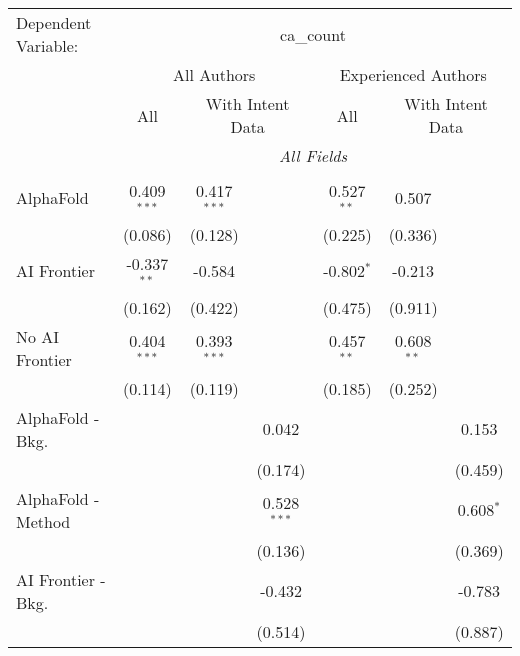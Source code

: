 \begingroup
\centering
\begin{tabular}{lcccccc}
   \tabularnewline \midrule \midrule
   Dependent Variable: & \multicolumn{6}{c}{ca\_count}\\
 & \multicolumn{3}{c}{All Authors} & \multicolumn{3}{c}{Experienced Authors} \\
\cmidrule(lr){2-4} \cmidrule(lr){5-7}
 & \multicolumn{1}{c}{All} & \multicolumn{2}{c}{With Intent Data} & \multicolumn{1}{c}{All} & \multicolumn{2}{c}{With Intent Data} \\
\cmidrule(lr){2-2} \cmidrule(lr){3-4} \cmidrule(lr){5-5} \cmidrule(lr){6-7}
 & \multicolumn{6}{c}{\textit{All Fields}} \\ \\
   AlphaFold               & 0.409$^{***}$ & 0.417$^{***}$ &               & 0.527$^{**}$ & 0.507        &   \\   
                           & (0.086)       & (0.128)       &               & (0.225)      & (0.336)      &   \\   
   AI Frontier             & -0.337$^{**}$ & -0.584        &               & -0.802$^{*}$ & -0.213       &   \\   
                           & (0.162)       & (0.422)       &               & (0.475)      & (0.911)      &   \\   
   No AI Frontier          & 0.404$^{***}$ & 0.393$^{***}$ &               & 0.457$^{**}$ & 0.608$^{**}$ &   \\   
                           & (0.114)       & (0.119)       &               & (0.185)      & (0.252)      &   \\   
   AlphaFold - Bkg.        &               &               & 0.042         &              &              & 0.153\\   
                           &               &               & (0.174)       &              &              & (0.459)\\   
   AlphaFold - Method      &               &               & 0.528$^{***}$ &              &              & 0.608$^{*}$\\   
                           &               &               & (0.136)       &              &              & (0.369)\\   
   AI Frontier - Bkg.      &               &               & -0.432        &              &              & -0.783\\   
                           &               &               & (0.514)       &              &              & (0.887)\\   

\end{tabular}

